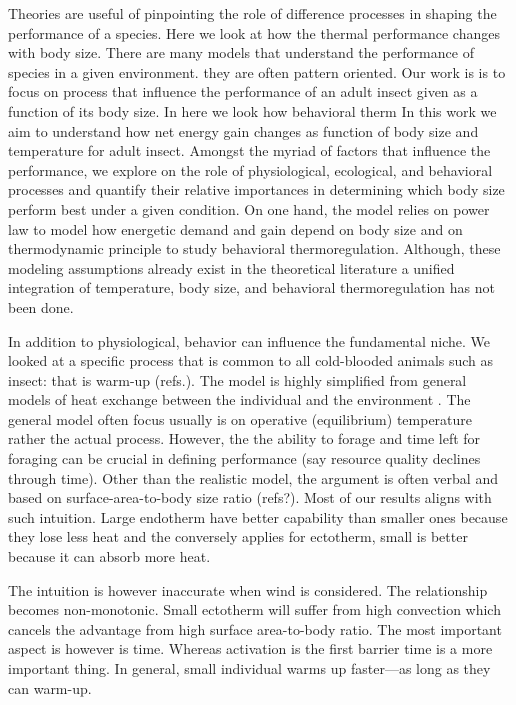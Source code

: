 Theories are useful of pinpointing the role of difference processes in shaping the performance of a species.
Here we look at how the thermal performance changes with body size. There are many models that understand the performance of species in a given environment.
they are often pattern oriented. 
Our work is is to focus on process that influence the performance of an adult insect given as a function of its body size.
In here we look how behavioral therm
 In this work we aim to understand how net energy gain changes as function of body size and temperature for adult insect.
 Amongst the myriad of factors that influence the performance, we explore on the role of  physiological, ecological, and behavioral processes and quantify their  relative importances in determining which body size perform best under a given condition.
On one hand, the model relies on power law to model how energetic demand and gain depend on body size and on thermodynamic principle to study behavioral thermoregulation. 
Although, these modeling assumptions already exist in the theoretical literature \citep[e.g.,][]{Brown1993, Kozlowski1997, Bakken1975} a unified integration of temperature, body size, and behavioral thermoregulation has not been done.





In addition to physiological, behavior can influence the fundamental niche.
We looked at a specific process that is common to all cold-blooded animals such as insect: that is warm-up (refs.).
The model is highly simplified from general models of heat exchange between the individual and the environment \citep[e.g.,][]{Campbell2012}.
The general model often focus usually is on operative (equilibrium) temperature \citep[e.g.]{Angilletta2009} rather the actual process.
However, the the ability to forage and time left for foraging can be crucial in defining performance (say resource quality declines through time).
Other than the realistic model, the argument is often verbal and based on surface-area-to-body size ratio (refs?).
Most of our results aligns with  such intuition. 
Large endotherm have better capability than smaller ones because they lose less heat and the conversely applies for ectotherm, small is better because it can absorb more heat.

The intuition is however inaccurate when wind is considered. 
The relationship becomes non-monotonic. 
Small ectotherm will suffer from high convection which cancels the advantage from high surface area-to-body ratio.
The most important aspect is however is time.
Whereas activation is the first barrier time is a more important thing.
In general, small individual warms up faster---as long as they can warm-up. 

